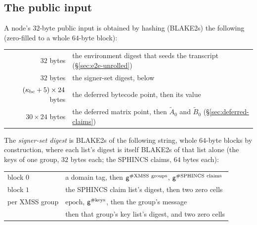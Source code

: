 \subsection{The public input}\label{sec:rec-stmt}

A node's $32$-byte public input is obtained by hashing (BLAKE2s) the following (zero-filled to a whole $64$-byte block):
\begin{center}
\begin{tabular}{@{}rl@{}}
\hline
$32$ bytes & the environment digest that seeds the transcript (\S\ref{sec:e2e-unrolled})\\
$32$ bytes & the signer-set digest, below\\
$(\kappa_{\mathrm{bc}}+5)\times24$ bytes & the deferred bytecode point, then its value\\
$30\times24$ bytes & the deferred matrix point, then $\widetilde A_0$ and $\widetilde B_0$ (\S\ref{sec:deferred-claims})\\
\hline
\end{tabular}
\end{center}

The \emph{signer-set digest} is BLAKE2s of the following string, whole $64$-byte blocks by construction, where each list's digest is itself BLAKE2s of that list alone (the keys of one group, $32$ bytes each; the SPHINCS claims, $64$ bytes each):
\begin{center}
\begin{tabular}{@{}ll@{}}
\hline
block $0$ & a domain tag, then $\mathsf{g}^{\#\mathrm{XMSS\ groups}}$, $\mathsf{g}^{\#\mathrm{SPHINCS\ claims}}$\\
block $1$ & the SPHINCS claim list's digest, then two zero cells\\
per XMSS group & $\mathrm{epoch}$, $\mathsf{g}^{\#\mathrm{keys}}$, then the group's message\\
& then that group's key list's digest, and two zero cells\\
\hline
\end{tabular}
\end{center}
